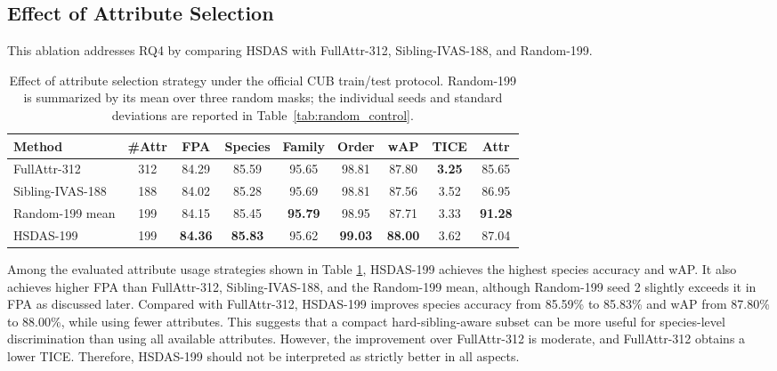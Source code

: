\subsection{Effect of Attribute Selection}

This ablation addresses RQ4 by comparing HSDAS with FullAttr-312, Sibling-IVAS-188, and Random-199.

\begin{table}[t]
    \centering
    \caption{Effect of attribute selection strategy under the official CUB train/test protocol. Random-199 is summarized by its mean over three random masks; the individual seeds and standard deviations are reported in Table~\ref{tab:random_control}.}
    \label{tab:attr_selection_ablation}
    \scriptsize
    \setlength{\tabcolsep}{3pt}
    \renewcommand{\arraystretch}{1.12}
    \begin{adjustbox}{max width=\textwidth}
    \begin{tabular}{@{}lcccccccc@{}}
        \hline
        \textbf{Method} & \textbf{\#Attr} & \textbf{FPA} & \textbf{Species} & \textbf{Family} & \textbf{Order} & \textbf{wAP} & \textbf{TICE} & \textbf{Attr} \\
        \hline
        FullAttr-312 & 312 & 84.29 & 85.59 & 95.65 & 98.81 & 87.80 & \textbf{3.25} & 85.65 \\
        Sibling-IVAS-188 & 188 & 84.02 & 85.28 & 95.69 & 98.81 & 87.56 & 3.52 & 86.95 \\
        Random-199 mean & 199 & 84.15 & 85.45 & \textbf{95.79} & 98.95 & 87.71 & 3.33 & \textbf{91.28} \\
        HSDAS-199 & 199 & \textbf{84.36} & \textbf{85.83} & 95.62 & \textbf{99.03} & \textbf{88.00} & 3.62 & 87.04 \\
        \hline
    \end{tabular}
    \end{adjustbox}
\end{table}

Among the evaluated attribute usage strategies shown in Table \ref{tab:attr_selection_ablation}, HSDAS-199 achieves the highest species accuracy and wAP. It also achieves higher FPA than FullAttr-312, Sibling-IVAS-188, and the Random-199 mean, although Random-199 seed 2 slightly exceeds it in FPA as discussed later. Compared with FullAttr-312, HSDAS-199 improves species accuracy from 85.59\% to 85.83\% and wAP from 87.80\% to 88.00\%, while using fewer attributes. This suggests that a compact hard-sibling-aware subset can be more useful for species-level discrimination than using all available attributes. However, the improvement over FullAttr-312 is moderate, and FullAttr-312 obtains a lower TICE. Therefore, HSDAS-199 should not be interpreted as strictly better in all aspects.


